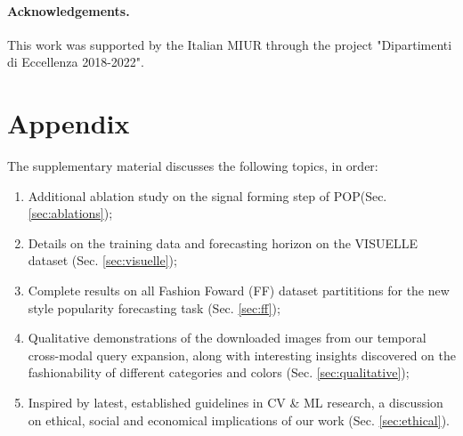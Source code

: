 \documentclass[runningheads]{llncs}
\newcommand{\snamebig}[0] {POP\xspace}
\begin{document}
\paragraph{\textbf{Acknowledgements.}} This work was supported by the Italian MIUR through the project "Dipartimenti di Eccellenza 2018-2022".  
\section{Appendix}
\label{sec:suppl}
\noindent The supplementary material discusses the following topics, in order:
\begin{enumerate}
    \item Additional ablation study on the signal forming step of \snamebig (Sec. \ref{sec:ablations});
    \item Details on the training data and forecasting horizon on the VISUELLE dataset (Sec. \ref{sec:visuelle});
    \item Complete results on all Fashion Foward (FF) dataset partititions for the new style popularity forecasting task (Sec. \ref{sec:ff});
    \item Qualitative demonstrations of the downloaded images from our temporal cross-modal query expansion, along with interesting insights discovered on the fashionability of different categories and colors (Sec. \ref{sec:qualitative});
    \item Inspired by latest, established guidelines in  CV \& ML research, a discussion on ethical, social and economical implications of our work (Sec. \ref{sec:ethical}).
\end{enumerate}
\end{document}
